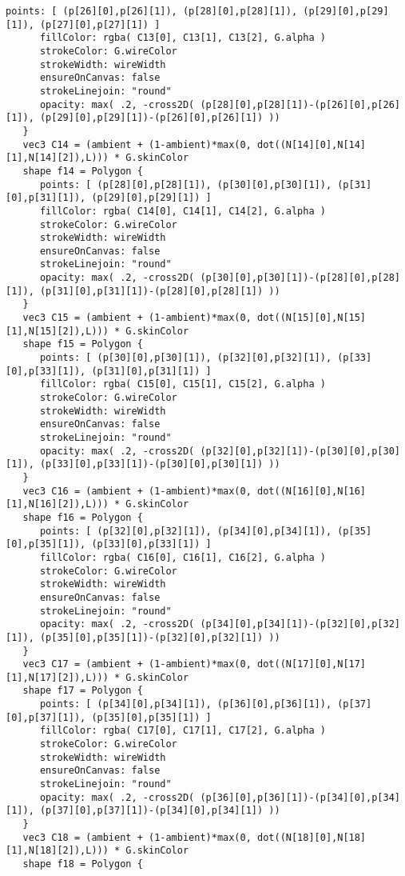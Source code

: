 \begin{lstlisting}[language=Sty-RT,escapechar=@]
      points: [ (p[26][0],p[26][1]), (p[28][0],p[28][1]), (p[29][0],p[29][1]), (p[27][0],p[27][1]) ]
      fillColor: rgba( C13[0], C13[1], C13[2], G.alpha )
      strokeColor: G.wireColor
      strokeWidth: wireWidth
      ensureOnCanvas: false
      strokeLinejoin: "round"
      opacity: max( .2, -cross2D( (p[28][0],p[28][1])-(p[26][0],p[26][1]), (p[29][0],p[29][1])-(p[26][0],p[26][1]) ))
   }
   vec3 C14 = (ambient + (1-ambient)*max(0, dot((N[14][0],N[14][1],N[14][2]),L))) * G.skinColor
   shape f14 = Polygon {
      points: [ (p[28][0],p[28][1]), (p[30][0],p[30][1]), (p[31][0],p[31][1]), (p[29][0],p[29][1]) ]
      fillColor: rgba( C14[0], C14[1], C14[2], G.alpha )
      strokeColor: G.wireColor
      strokeWidth: wireWidth
      ensureOnCanvas: false
      strokeLinejoin: "round"
      opacity: max( .2, -cross2D( (p[30][0],p[30][1])-(p[28][0],p[28][1]), (p[31][0],p[31][1])-(p[28][0],p[28][1]) ))
   }
   vec3 C15 = (ambient + (1-ambient)*max(0, dot((N[15][0],N[15][1],N[15][2]),L))) * G.skinColor
   shape f15 = Polygon {
      points: [ (p[30][0],p[30][1]), (p[32][0],p[32][1]), (p[33][0],p[33][1]), (p[31][0],p[31][1]) ]
      fillColor: rgba( C15[0], C15[1], C15[2], G.alpha )
      strokeColor: G.wireColor
      strokeWidth: wireWidth
      ensureOnCanvas: false
      strokeLinejoin: "round"
      opacity: max( .2, -cross2D( (p[32][0],p[32][1])-(p[30][0],p[30][1]), (p[33][0],p[33][1])-(p[30][0],p[30][1]) ))
   }
   vec3 C16 = (ambient + (1-ambient)*max(0, dot((N[16][0],N[16][1],N[16][2]),L))) * G.skinColor
   shape f16 = Polygon {
      points: [ (p[32][0],p[32][1]), (p[34][0],p[34][1]), (p[35][0],p[35][1]), (p[33][0],p[33][1]) ]
      fillColor: rgba( C16[0], C16[1], C16[2], G.alpha )
      strokeColor: G.wireColor
      strokeWidth: wireWidth
      ensureOnCanvas: false
      strokeLinejoin: "round"
      opacity: max( .2, -cross2D( (p[34][0],p[34][1])-(p[32][0],p[32][1]), (p[35][0],p[35][1])-(p[32][0],p[32][1]) ))
   }
   vec3 C17 = (ambient + (1-ambient)*max(0, dot((N[17][0],N[17][1],N[17][2]),L))) * G.skinColor
   shape f17 = Polygon {
      points: [ (p[34][0],p[34][1]), (p[36][0],p[36][1]), (p[37][0],p[37][1]), (p[35][0],p[35][1]) ]
      fillColor: rgba( C17[0], C17[1], C17[2], G.alpha )
      strokeColor: G.wireColor
      strokeWidth: wireWidth
      ensureOnCanvas: false
      strokeLinejoin: "round"
      opacity: max( .2, -cross2D( (p[36][0],p[36][1])-(p[34][0],p[34][1]), (p[37][0],p[37][1])-(p[34][0],p[34][1]) ))
   }
   vec3 C18 = (ambient + (1-ambient)*max(0, dot((N[18][0],N[18][1],N[18][2]),L))) * G.skinColor
   shape f18 = Polygon {

\end{lstlisting}
